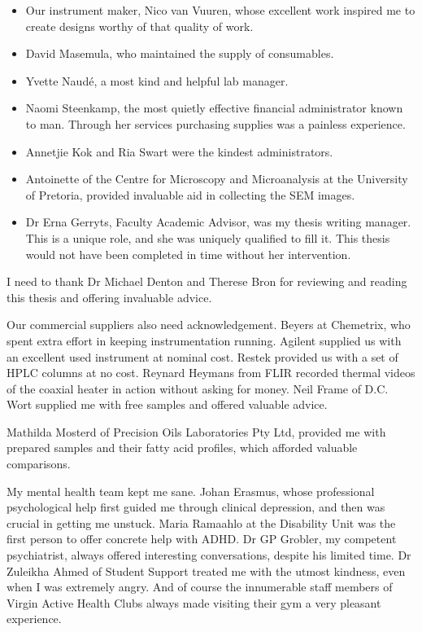 \documentclass[
11pt, %
english, %
singlespacing, %
liststotoc, %
toctotoc, %
headsepline, %
]{MastersDoctoralThesis} %
\begin{document}
\begin{acknowledgements}
\begin{itemize}
\item Our instrument maker, Nico van Vuuren, whose excellent work inspired me to
create designs worthy of that quality of work.

\item David Masemula, who maintained the supply of consumables.

\item Yvette Naudé, a most kind and helpful lab manager.

\item Naomi Steenkamp, the most quietly effective financial administrator known to
man. Through her services purchasing supplies was a painless experience.

\item Annetjie Kok and Ria Swart were the kindest administrators.

\item Antoinette of the Centre for Microscopy and Microanalysis at the
University of Pretoria, provided invaluable aid in collecting the SEM images.

\item Dr Erna Gerryts, Faculty Academic Advisor, was my thesis writing manager.
This is a unique role, and she was uniquely qualified to fill it. This thesis
would not have been completed in time without her intervention.

\end{itemize}

I need to thank Dr Michael Denton and Therese Bron for reviewing and reading
this thesis and offering invaluable advice.

Our commercial suppliers also need acknowledgement. Beyers at Chemetrix, who
spent extra effort in keeping instrumentation running. Agilent supplied
us with an excellent used instrument at nominal cost. Restek provided us with a
set of HPLC columns at no cost. Reynard Heymans from FLIR recorded thermal
videos of the coaxial heater in action without asking for money. Neil Frame of
D.C. Wort supplied me with free samples and offered valuable advice.

Mathilda Mosterd of Precision Oils Laboratories Pty Ltd, provided me with
prepared samples and their fatty acid profiles, which afforded valuable
comparisons.

My mental health team kept me sane. Johan Erasmus, whose professional
psychological help first guided me through clinical depression, and then was
crucial in getting me unstuck. Maria Ramaahlo at the Disability Unit was the
first person to offer concrete help with ADHD. Dr GP Grobler, my competent
psychiatrist, always offered interesting conversations, despite his limited
time. Dr Zuleikha Ahmed of Student Support treated me with the utmost kindness,
even when I was extremely angry. And of course the innumerable staff members of
Virgin Active Health Clubs always made visiting their gym a very pleasant
experience.


\end{acknowledgements}
\end{document}
